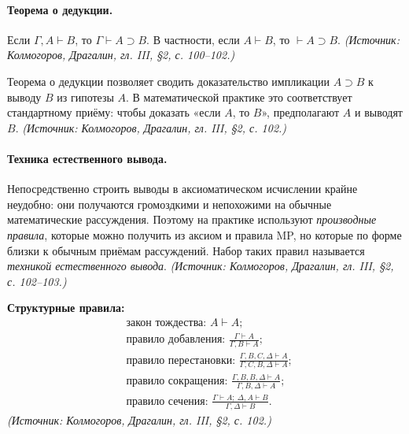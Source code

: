 \documentclass[a4paper,12pt]{article}
\begin{document}
\paragraph{Теорема о дедукции.} Если \(\Gamma,A\vdash B\), то \(\Gamma\vdash A\supset B\). В частности, если \(A\vdash B\), то \(\vdash A\supset B\).
\textit{(Источник: Колмогоров, Драгалин, гл. III, §2, с. 100--102.)}

Теорема о дедукции позволяет сводить доказательство импликации \(A\supset B\) к выводу \(B\) из гипотезы \(A\). В математической практике это соответствует стандартному приёму: чтобы доказать «если \(A\), то \(B\)», предполагают \(A\) и выводят \(B\).
\textit{(Источник: Колмогоров, Драгалин, гл. III, §2, с. 102.)}

\paragraph{Техника естественного вывода.} Непосредственно строить выводы в аксиоматическом исчислении крайне неудобно: они получаются громоздкими и непохожими на обычные математические рассуждения. Поэтому на практике используют \emph{производные правила}, которые можно получить из аксиом и правила MP, но которые по форме близки к обычным приёмам рассуждений. Набор таких правил называется \emph{техникой естественного вывода}.
\textit{(Источник: Колмогоров, Драгалин, гл. III, §2, с. 102--103.)}

\textbf{Структурные правила:}
\[
\begin{aligned}
&\text{закон тождества: } A\vdash A;\\
&\text{правило добавления: } \frac{\Gamma\vdash A}{\Gamma,B\vdash A};\\
&\text{правило перестановки: } \frac{\Gamma,B,C,\Delta\vdash A}{\Gamma,C,B,\Delta\vdash A};\\
&\text{правило сокращения: } \frac{\Gamma,B,B,\Delta\vdash A}{\Gamma,B,\Delta\vdash A};\\
&\text{правило сечения: } \frac{\Gamma\vdash A;\ \Delta,A\vdash B}{\Gamma,\Delta\vdash B}.
\end{aligned}
\]
\textit{(Источник: Колмогоров, Драгалин, гл. III, §2, с. 102.)}
\end{document}
